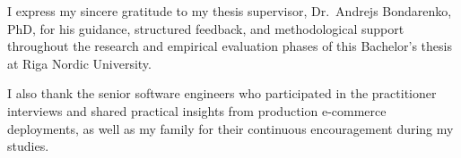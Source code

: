 \frontmatterpage
{}
I express my sincere gratitude to my thesis supervisor, Dr.\ Andrejs Bondarenko, PhD, for his guidance, structured feedback, and methodological support throughout the research and empirical evaluation phases of this Bachelor's thesis at Riga Nordic University.

I also thank the senior software engineers who participated in the practitioner interviews and shared practical insights from production e-commerce deployments, as well as my family for their continuous encouragement during my studies.
